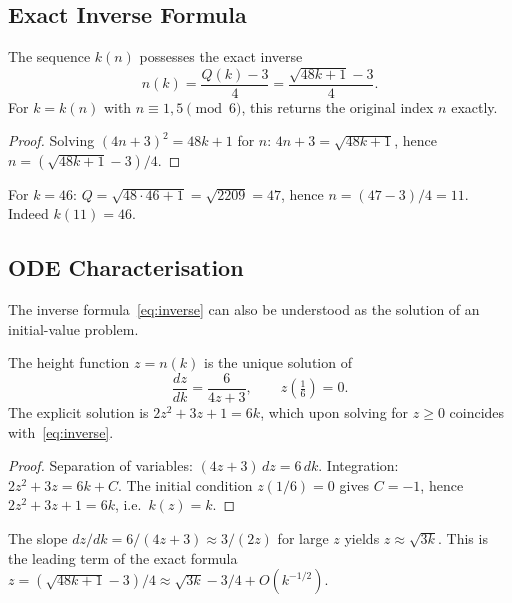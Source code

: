\subsection{Exact Inverse Formula}

\begin{theorem}[Inverse of $k(n)$]\label{thm:inverse}
The sequence $k(n)$ possesses the exact inverse
\begin{equation}\label{eq:inverse}
  n(k) = \frac{Q(k) - 3}{4} = \frac{\sqrt{48k+1} - 3}{4}.
\end{equation}
For $k = k(n)$ with $n \equiv 1, 5 \pmod{6}$, this returns the
original index $n$ exactly.
\end{theorem}

\begin{proof}
Solving $(4n+3)^2 = 48k+1$ for $n$:
$4n+3 = \sqrt{48k+1}$, hence $n = (\sqrt{48k+1}-3)/4$.
\end{proof}

\begin{example}
For $k = 46$: $Q = \sqrt{48 \cdot 46 + 1} = \sqrt{2209} = 47$,
hence $n = (47-3)/4 = 11$. Indeed $k(11) = 46$.
\end{example}

\subsection{ODE Characterisation}\label{subsec:ode}

The inverse formula~\eqref{eq:inverse} can also be understood as the
solution of an initial-value problem.

\begin{theorem}\label{thm:ode}
The height function $z = n(k)$ is the unique solution of
\begin{equation}\label{eq:ode}
  \frac{dz}{dk} = \frac{6}{4z+3}, \qquad z\!\left(\tfrac{1}{6}\right) = 0.
\end{equation}
The explicit solution is $2z^2 + 3z + 1 = 6k$, which upon solving for
$z \geq 0$ coincides with~\eqref{eq:inverse}.
\end{theorem}

\begin{proof}
Separation of variables: $(4z+3)\,dz = 6\,dk$.
Integration: $2z^2 + 3z = 6k + C$.
The initial condition $z(1/6) = 0$ gives $C = -1$, hence
$2z^2+3z+1 = 6k$, i.e.\ $k(z) = k$.
\end{proof}

\begin{remark}[Asymptotics]
The slope $dz/dk = 6/(4z+3) \approx 3/(2z)$ for large $z$ yields
$z \approx \sqrt{3k}$. This is the leading term of the exact formula
$z = (\sqrt{48k+1}-3)/4 \approx \sqrt{3k} - 3/4 + O(k^{-1/2})$.
\end{remark}

